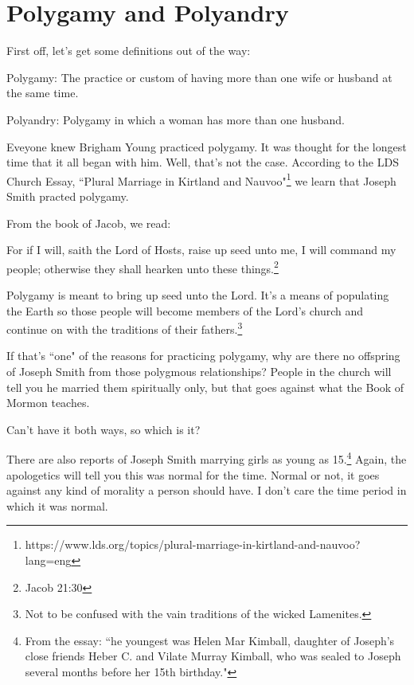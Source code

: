 \section{Polygamy and Polyandry}

First off, let's get some definitions out of the way:

\begin{displayquote}
Polygamy: The practice or custom of having more than one wife or husband at the same 
time.
\end{displayquote}

\begin{displayquote}
Polyandry: Polygamy in which a woman has more than one husband.
\end{displayquote}

Eveyone knew Brigham Young practiced polygamy. It was thought for the longest time 
that it all began with him. Well, that's not the case. According to the LDS Church
Essay, ``Plural Marriage in Kirtland and Nauvoo"\footnote{
https://www.lds.org/topics/plural-marriage-in-kirtland-and-nauvoo?lang=eng
} we learn that Joseph Smith practed polygamy.

From the book of Jacob, we read:

\begin{displayquote}
For if I will, saith the Lord of Hosts, raise up seed unto me, 
I will command my people; otherwise they shall hearken unto these 
things.\footnote{Jacob 21:30}
\end{displayquote}

Polygamy is meant to bring up seed unto the Lord. It's a means of populating the
Earth so those people will become members of the Lord's church and continue on with
the traditions of their fathers.\footnote{Not to be confused with the vain traditions
of the wicked Lamenites.}

If that's ``one" of the reasons for practicing polygamy, why are there no offspring
of Joseph Smith from those polygmous relationships? People in the church will tell
you he married them spiritually only, but that goes against what the Book of Mormon
teaches.

Can't have it both ways, so which is it?

There are also reports of Joseph Smith marrying girls as young as 15.\footnote{
From the essay: ``he youngest was Helen Mar Kimball, daughter of Joseph’s close 
friends Heber C. and Vilate Murray Kimball, who was sealed to Joseph several 
months before her 15th birthday."
} Again, the apologetics will tell you this was normal for the time. Normal or not,
it goes against any kind of morality a person should have. I don't care the time
period in which it was normal.

